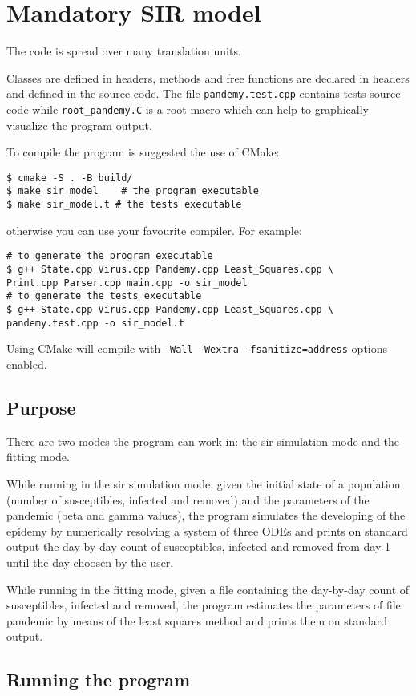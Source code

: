 \section{Mandatory SIR model}

The code is spread over many translation units.

Classes are defined in headers, methods and free functions are declared in headers and defined in the source code. The file \verb!pandemy.test.cpp! contains tests source code while \verb!root_pandemy.C! is a root macro which can help to graphically visualize the program output.

To compile the program is suggested the use of CMake:
\begin{verbatim}
$ cmake -S . -B build/
$ make sir_model    # the program executable
$ make sir_model.t # the tests executable
\end{verbatim}
otherwise you can use your favourite compiler. For example:
\begin{verbatim}
# to generate the program executable
$ g++ State.cpp Virus.cpp Pandemy.cpp Least_Squares.cpp \
Print.cpp Parser.cpp main.cpp -o sir_model
# to generate the tests executable
$ g++ State.cpp Virus.cpp Pandemy.cpp Least_Squares.cpp \
pandemy.test.cpp -o sir_model.t
\end{verbatim}
Using CMake will compile with \verb!-Wall -Wextra -fsanitize=address! options enabled.

\subsection{Purpose}

There are two modes the program can work in: the sir simulation mode and the fitting mode.

While running in the sir simulation mode, given the initial state of a population (number of susceptibles, infected and removed) and the parameters of the pandemic (beta and gamma values), the program simulates the developing of the epidemy by numerically resolving a system of three ODEs and prints on standard output the day-by-day count of susceptibles, infected and removed from day 1 until the day choosen by the user.

While running in the fitting mode, given a file containing the day-by-day count of susceptibles, infected and removed, the program estimates the parameters of file pandemic by means of the least squares method and prints them on standard output.

\subsection{Running the program}

